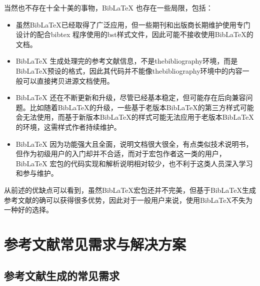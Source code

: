 \documentclass[twoside]{article} %
\begin{document}
当然也不存在十全十美的事物，BibLaTeX 也存在一些局限，包括：

\begin{itemize}
 \item 虽然BibLaTeX已经取得了广泛应用，但一些期刊和出版商长期维护使用专门设计的配合bibtex 程序使用的bst样式文件，因此可能不接收使用BibLaTeX的文档。

 \item BibLaTeX 生成处理完的参考文献信息，不是thebibliography环境，而是BibLaTeX预设的格式，因此其代码并不能像thebibliography环境中的内容一般可以直接拷贝进源文档使用。

 \item BibLaTeX 还在不断更新和升级，尽管已经基本稳定，但可能存在后向兼容问题。比如随着BibLaTeX的升级，一些基于老版本BibLaTeX的第三方样式可能会无法使用，而基于新版本BibLaTeX的样式可能无法应用于老版本BibLaTeX的环境，这需样式作者持续维护。

 \item BibLaTeX 因为功能强大且全面，说明文档很大很全，有点类似技术说明书，但作为初级用户的入门却并不合适，而对于宏包作者这一类的用户，BibLaTeX 宏包的代码实现和解析说明相对较少，也不利于这类人员深入学习和参与维护。
\end{itemize}

从前述的优缺点可以看到，虽然BibLaTeX宏包还并不完美，但基于BibLaTeX生成参考文献的确可以获得很多优势，因此对于一般用户来说，使用BibLaTeX不失为一种好的选择。



\section{参考文献常见需求与解决方案}

\subsection{参考文献生成的常见需求}
\end{document}
